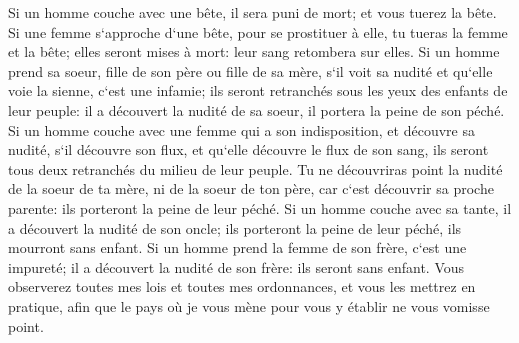 \verse Si un homme couche avec une bête, il sera puni de mort; et vous tuerez la bête. 
\verse Si une femme s`approche d`une bête, pour se prostituer à elle, tu tueras la femme et la bête; elles seront mises à mort: leur sang retombera sur elles. 
\verse Si un homme prend sa soeur, fille de son père ou fille de sa mère, s`il voit sa nudité et qu`elle voie la sienne, c`est une infamie; ils seront retranchés sous les yeux des enfants de leur peuple: il a découvert la nudité de sa soeur, il portera la peine de son péché. 
\verse Si un homme couche avec une femme qui a son indisposition, et découvre sa nudité, s`il découvre son flux, et qu`elle découvre le flux de son sang, ils seront tous deux retranchés du milieu de leur peuple. 
\verse Tu ne découvriras point la nudité de la soeur de ta mère, ni de la soeur de ton père, car c`est découvrir sa proche parente: ils porteront la peine de leur péché. 
\verse Si un homme couche avec sa tante, il a découvert la nudité de son oncle; ils porteront la peine de leur péché, ils mourront sans enfant. 
\verse Si un homme prend la femme de son frère, c`est une impureté; il a découvert la nudité de son frère: ils seront sans enfant. 
\verse Vous observerez toutes mes lois et toutes mes ordonnances, et vous les mettrez en pratique, afin que le pays où je vous mène pour vous y établir ne vous vomisse point. 
